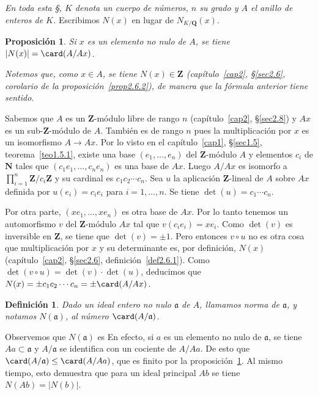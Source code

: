 \documentclass[bibtotoc,leqno,spanish]{amsbook}
\let\emph\relax %
\newcommand{\QQ}{\mathbf{Q}}
\newcommand{\ZZ}{\mathbf{Z}}
\newcommand{\NN}{\mathbf{N}}
\newcommand{\idl}[1]{\mathfrak{#1}}
\newcommand{\QED}{LQQD.}
\newcommand{\abs}[1]{\left\lvert#1\right\rvert}
\renewcommand{\to}[1][]{\xrightarrow{#1}}
\numberwithin{equation}{section}
\newenvironment{comm}%
	{\begin{list}{}{\setlength{\leftmargin}{2\parindent}\setlength{\topsep}{\baselineskip}}\item\itshape}
	{\end{list}}
\theoremstyle{note}
\newtheorem{definition}{Definici\'on}
\theoremstyle{note}
\newtheorem{proposition}{Proposici\'on}
\theoremstyle{rem}
\numberwithin{theorem}{section}
\numberwithin{proposition}{section}
\numberwithin{definition}{section}
\numberwithin{lemma}{section}
\numberwithin{corollary}{section}
\numberwithin{example}{section}
\numberwithin{footnote}{section}%
\begin{document}
\begin{trivlist}\item
{\itshape En toda esta \S, $K$ denota un cuerpo de n\'umeros, $n$ su grado y $A$ el anillo
de enteros de $K$.} Escribimos $N(x)$ en lugar de $N_{K/\QQ}(x)$.
\end{trivlist}

\begin{proposition}\label{prop3.5.1}
Si $x$ es un elemento no nulo de $A$, se tiene $\abs{N(x)} = \card(A/Ax)$.
\end{proposition}

\begin{comm}
Notemos que, como $x\in A$, se tiene $N(x)\in\ZZ$ (cap\'itulo~\ref{cap2}, \S\ref{sec2.6}, corolario de la
proposici\'on~\ref{prop2.6.2}), de manera que
la f\'ormula anterior tiene sentido.
\end{comm}

Sabemos que $A$ es un $\ZZ$-m\'odulo libre de rango $n$ (cap\'itulo~\ref{cap2}, \S\ref{sec2.8}) y $Ax$ es un
sub-$\ZZ$-m\'odulo de $A$. Tambi\'en es de rango $n$ pues la multiplicaci\'on por $x$
es un isomorfismo $A\to Ax$. Por lo visto en el cap\'itulo~\ref{cap1}, \S\ref{sec1.5}, teorema~\ref{teo1.5.1}, existe una base
$(e_{1},\dots,e_{n})$ del $\ZZ$-m\'odulo $A$ y elementos $c_{i}$ de $\NN$ tales que
$(c_{1}e_{1},\dots,c_{n}e_{n})$ es una base de $Ax$. Luego $A/Ax$ es isomorfo a
$\prod_{i=1}^{n}\ZZ/c_{i}\ZZ$ y su cardinal es $c_{1}c_{2}\cdots c_{n}$. Sea $u$ la
aplicaci\'on $\ZZ$-lineal de $A$ sobre $Ax$ definida por $u(e_{i}) = c_{i}e_{i}$ para
$i=1,\dots,n$. Se tiene $\det(u) = c_{1}\cdots c_{n}$.

Por otra parte, $(xe_{1},\dots,xe_{n})$ es otra base de $Ax$. Por lo tanto tenemos un automorfismo
$v$ del $\ZZ$-m\'odulo $Ax$ tal que $v(c_{i}e_{i}) = xe_{i}$. Como $\det(v)$ es inversible en $\ZZ$,
se tiene que $\det(v)=\pm 1$. Pero entonces $v\circ u$ no es otra cosa que multiplicaci\'on por $x$
y su determinante es, por definici\'on, $N(x)$ (cap\'itulo~\ref{cap2}, \S\ref{sec2.6},
definici\'on~\ref{def2.6.1}). Como $\det(v\circ u)=
\det(v)\cdot\det(u)$, deducimos que $N(x) = \pm c_{1}c_{2}\cdots c_{n}=\pm \card(A/Ax)$.%

\begin{definition}\label{def3.5.1}
Dado un ideal entero no nulo $\idl{a}$ de $A$, llamamos norma de $\idl{a}$, y notamos $N(\idl{a})$,
al n\'umero $\card(A/\idl{a})$.
\end{definition}

Observemos que $N(\idl{a})$ es \emph{finito.} En efecto, si $a$ es un elemento no nulo de $\idl{a}$,
se tiene $Aa\subset\idl{a}$ y $A/\idl{a}$ se identifica con un cociente de $A/Aa$. De esto que
$\card(A/\idl{a})\leq\card(A/Aa)$, que es finito por la proposici\'on~\ref{prop3.5.1}. Al mismo tiempo, esto demuestra que
para un ideal principal $Ab$ se tiene $N(Ab) = \abs{N(b)}$.
\end{document}

